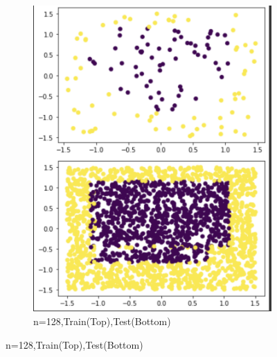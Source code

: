 \documentclass[a4paper]{article}
\theoremstyle{definition}
\newenvironment{soln}{
    \leavevmode\color{blue}\ignorespaces
}{}
\begin{document}
\begin{soln}
\begin{figure}[H]
\begin{subfigure}{0.5\textwidth}
            \includegraphics[scale=0.5]{sk128.png}
            \caption{n=128,Train(Top),Test(Bottom)}
            \label{fig:q2}
        \end{subfigure}%
        \end{figure} 
        \begin{figure}[H]
        \begin{subfigure}{0.5\textwidth}
            \centering

\end{subfigure}
\end{figure}
\end{soln}
\end{document}
